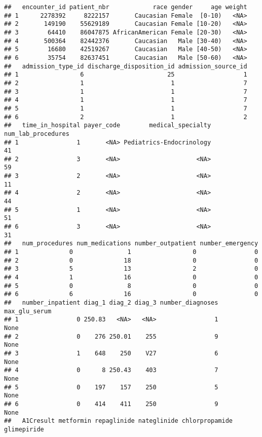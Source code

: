 \documentclass[]{article}
\begin{document}
\begin{verbatim}
##   encounter_id patient_nbr            race gender     age weight
## 1      2278392     8222157       Caucasian Female  [0-10)   <NA>
## 2       149190    55629189       Caucasian Female [10-20)   <NA>
## 3        64410    86047875 AfricanAmerican Female [20-30)   <NA>
## 4       500364    82442376       Caucasian   Male [30-40)   <NA>
## 5        16680    42519267       Caucasian   Male [40-50)   <NA>
## 6        35754    82637451       Caucasian   Male [50-60)   <NA>
##   admission_type_id discharge_disposition_id admission_source_id
## 1                 6                       25                   1
## 2                 1                        1                   7
## 3                 1                        1                   7
## 4                 1                        1                   7
## 5                 1                        1                   7
## 6                 2                        1                   2
##   time_in_hospital payer_code        medical_specialty num_lab_procedures
## 1                1       <NA> Pediatrics-Endocrinology                 41
## 2                3       <NA>                     <NA>                 59
## 3                2       <NA>                     <NA>                 11
## 4                2       <NA>                     <NA>                 44
## 5                1       <NA>                     <NA>                 51
## 6                3       <NA>                     <NA>                 31
##   num_procedures num_medications number_outpatient number_emergency
## 1              0               1                 0                0
## 2              0              18                 0                0
## 3              5              13                 2                0
## 4              1              16                 0                0
## 5              0               8                 0                0
## 6              6              16                 0                0
##   number_inpatient diag_1 diag_2 diag_3 number_diagnoses max_glu_serum
## 1                0 250.83   <NA>   <NA>                1          None
## 2                0    276 250.01    255                9          None
## 3                1    648    250    V27                6          None
## 4                0      8 250.43    403                7          None
## 5                0    197    157    250                5          None
## 6                0    414    411    250                9          None
##   A1Cresult metformin repaglinide nateglinide chlorpropamide glimepiride

\end{verbatim}
\end{document}
